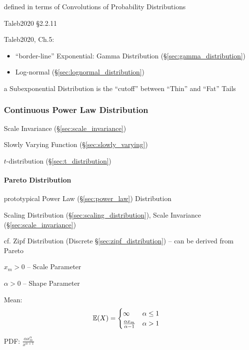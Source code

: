 defined in terms of Convolutions of Probability Distributions

Taleb2020 \S 2.2.11

Taleb2020, Ch.5:

\begin{itemize}
  \item ``border-line'' Exponential: Gamma Distribution
    (\S\ref{sec:gamma_distribution})
  \item Log-normal (\S\ref{sec:lognormal_distribution})
\end{itemize}

a Subexponential Distribution is the ``cutoff'' between ``Thin'' and ``Fat''
Tails



\subsubsection{Continuous Power Law Distribution}
\label{sec:continuous_power_law}

Scale Invariance (\S\ref{sec:scale_invariance})

Slowly Varying Function (\S\ref{sec:slowly_varying})

$t$-distribution (\S\ref{sec:t_distribution})



\paragraph{Pareto Distribution}\label{sec:pareto_distribution}\hfill

prototypical Power Law (\S\ref{sec:power_law}) Distribution

Scaling Distribution (\S\ref{sec:scaling_distribution}),
Scale Invariance (\S\ref{sec:scale_invariance})

cf. Zipf Distribution (Discrete \S\ref{sec:zipf_distribution}) -- can be derived
from Pareto

$x_m > 0$ -- Scale Parameter

$\alpha > 0$ -- Shape Parameter

Mean:
\[
  \mathbb{E}(X) = \begin{cases}
    \infty                      & \alpha \leq 1 \\
    \frac{\alpha x_m}{\alpha-1} & \alpha > 1 \\
  \end{cases}
\]

PDF: $\frac{\alpha x_m^\alpha}{x^{\alpha+1}}$

